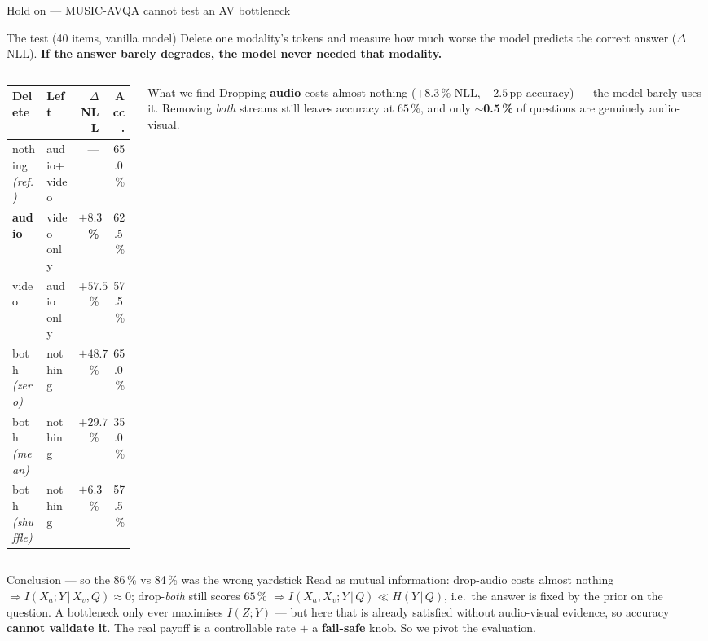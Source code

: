 \documentclass[10pt,aspectratio=169]{beamer}
\begin{document}
\begin{frame}{Hold on --- MUSIC-AVQA cannot test an AV bottleneck}

\begin{block}{The test (40 items, vanilla model)}
{\footnotesize
Delete one modality's tokens and measure how much worse the model predicts the
correct answer ($\Delta$NLL). \textbf{If the answer barely degrades, the model
never needed that modality.}}
\end{block}

\begin{columns}[T]
\begin{column}{0.54\textwidth}
\centering
{\footnotesize
\begin{tabular}{l l r r}
\toprule
\textbf{Delete} & \textbf{Left} & \textbf{$\Delta$NLL} & \textbf{Acc.} \\
\midrule
nothing \emph{(ref.)} & audio+video & --- & 65.0\,\% \\
\rowcolor{paperD!12}
\textbf{audio} & video only & \textbf{$+8.3$\,\%} & 62.5\,\% \\
video & audio only & $+57.5$\,\% & 57.5\,\% \\
both \emph{(zero)} & nothing & $+48.7$\,\% & 65.0\,\% \\
both \emph{(mean)} & nothing & $+29.7$\,\% & 35.0\,\% \\
both \emph{(shuffle)} & nothing & $+6.3$\,\% & 57.5\,\% \\
\bottomrule
\end{tabular}}
\end{column}

\begin{column}{0.44\textwidth}
\begin{block}{What we find}
{\footnotesize
Dropping \textbf{audio} costs almost nothing ($+8.3$\,\% NLL, $-2.5$\,pp
accuracy) --- the model barely uses it. Removing \emph{both} streams still
leaves accuracy at $65$\,\%, and only $\sim$\textbf{0.5\,\%} of questions are
genuinely audio-visual.}
\end{block}
\end{column}
\end{columns}

\vspace{4pt}
\begin{block}{Conclusion --- so the 86\,\% vs 84\,\% was the wrong yardstick}
{\footnotesize
Read as mutual information: drop-audio costs almost nothing
$\Rightarrow I(X_a;Y\,|\,X_v,Q)\!\approx\!0$; drop-\emph{both} still scores
$65$\,\% $\Rightarrow I(X_a,X_v;Y\,|\,Q)\!\ll\!H(Y\,|\,Q)$, i.e.\ the answer is
fixed by the prior on the question. A bottleneck only ever maximises $I(Z;Y)$ ---
but here that is already satisfied without audio-visual evidence, so accuracy
\textbf{cannot validate it}. The real payoff is a controllable rate $+$ a
\textbf{fail-safe} knob. So we pivot the evaluation.}
\end{block}

\end{frame}
\end{document}
